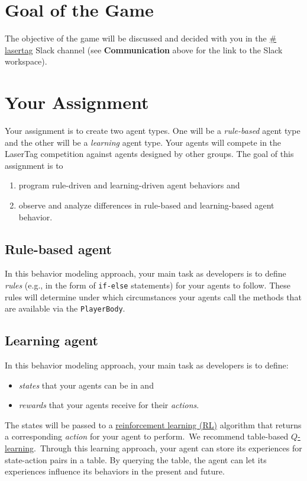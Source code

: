 \documentclass[
    a4paper,
    english,
    DIV=16,
    11pt,
    parskip=half,
]{scrartcl}
\begin{document}
\section*{Goal of the Game}
The objective of the game will be discussed and decided with you in the \underline{\# lasertag} Slack channel (see \textbf{Communication} above for the link to the Slack workspace).

\section*{Your Assignment}
Your assignment is to create two agent types. One will be a \emph{rule-based} agent type and the other will be a \emph{learning} agent type. Your agents will compete in the LaserTag competition against agents designed by other groups. The goal of this assignment is to
\begin{enumerate}
  \item program rule-driven and learning-driven agent behaviors and
  \item observe and analyze differences in rule-based and learning-based agent behavior.
\end{enumerate}

\subsection*{Rule-based agent}
In this behavior modeling approach, your main task as developers is to define \emph{rules} (e.g., in the form of \texttt{if-else} statements) for your agents to follow. These rules will determine under which circumstances your agents call the methods that are available via the \texttt{PlayerBody}.

\subsection*{Learning agent}
In this behavior modeling approach, your main task as developers is to define:
\begin{itemize}
  \item \emph{states} that your agents can be in and
  \item \emph{rewards} that your agents receive for their \emph{actions}.
\end{itemize}
The states will be passed to a \href{https://en.wikipedia.org/wiki/Reinforcement\_learning}{reinforcement learning (RL)} algorithm that returns a corresponding \emph{action} for your agent to perform.~We recommend table-based \href{https://en.wikipedia.org/wiki/Q-learning}{$Q$-learning}.~Through this learning approach, your agent can store its experiences for state-action pairs in a table. By querying the table, the agent can let its experiences influence its behaviors in the present and future.
\end{document}

